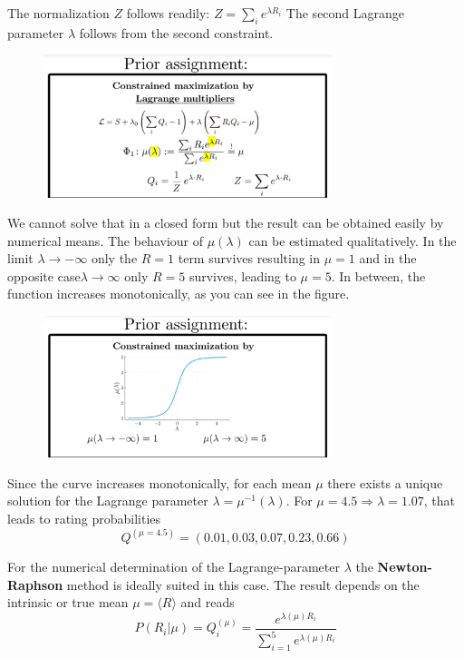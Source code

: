 \documentclass[12pt, a4paper]{scrartcl}
\begin{document}
The normalization $Z$ follows readily: $Z=\sum_ie^{\lambda R_i}$
The second Lagrange parameter $\lambda$ follows from the second constraint.
 \begin{figure}[H]
	\centering
	\includegraphics[width=0.75\textwidth]{6_7.png}
\end{figure}
We cannot solve that in a closed form but the result can be obtained easily
by numerical means.
The behaviour of $\mu(\lambda)$ can be estimated qualitatively. In the limit $\lambda\rightarrow -\infty$
only the $R=1$ term survives resulting in $\mu = 1$ and in the opposite
case$\lambda \rightarrow \infty$ only $R = 5$ survives, leading to $\mu=5$. In between, the
function increases monotonically, as you can see in the figure. %
 \begin{figure}[H]
	\centering
	\includegraphics[width=0.75\textwidth]{6_8.png}
\end{figure}
Since the curve
increases monotonically, for each mean $\mu$ there exists a unique solution for
the Lagrange parameter $\lambda=\mu^{-1}(\lambda)$. For $\mu =4.5 \Rightarrow \lambda=1.07$, that leads to rating probabilities \[Q^{(\mu=4.5)}=(0.01,0.03,0.07,0.23,0.66)\]

For the numerical determination of the Lagrange-parameter $\lambda$
the \textbf{Newton-Raphson} method is ideally suited in this case. The result depends on the
intrinsic or true mean $\mu=\langle R\rangle$ and reads\\%

\begin{equation*}\boxed{P(R_i|\mu)=Q_i^{(\mu)}=\frac{e^{\lambda(\mu)R_i}}{\sum_{i=1}^5e^{\lambda(\mu)R_i}}
}\end{equation*}\\
\end{document}
